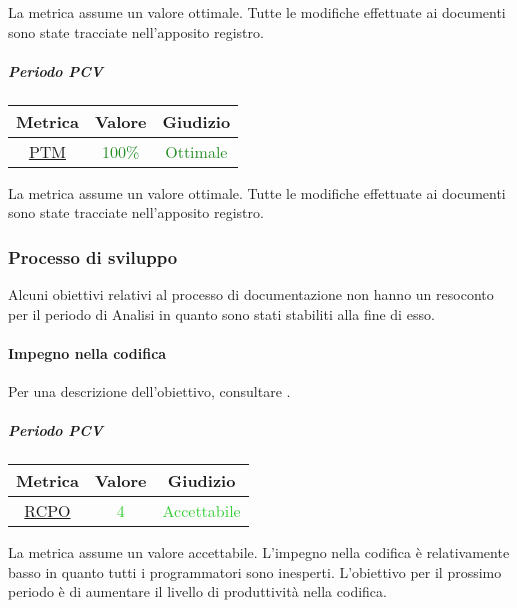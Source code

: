 			La metrica assume un valore ottimale. Tutte le modifiche effettuate ai documenti sono state tracciate nell'apposito registro.
			
			\subparagraph{Periodo PCV} 
			\begin{table}[H]
				\centering
				\begin{tabular}{  c | c | c}
					\hline
					\textbf{Metrica} & \textbf{Valore} & \textbf{Giudizio} \\
					\hline
					\hyperref[MMC]{PTM}   & \textcolor{ForestGreen}{100\%}          & \textcolor{ForestGreen}{Ottimale} \\ \hline
				\end{tabular} 
			\end{table}
			
					La metrica assume un valore ottimale. Tutte le modifiche effettuate ai documenti sono state tracciate nell'apposito registro.
					\newpage
					
		\subsubsection{Processo di sviluppo}
			Alcuni obiettivi relativi al processo di documentazione non hanno un resoconto per il periodo di Analisi in quanto sono stati stabiliti alla fine di esso.
				

				
				\paragraph{Impegno nella codifica}
					Per una descrizione dell'obiettivo, consultare .
					
					\subparagraph{Periodo PCV} 
					\begin{table}[H]
						\centering
						\begin{tabular}{  c | c | c}
							\hline
							\textbf{Metrica} & \textbf{Valore} & \textbf{Giudizio} \\
							\hline
							\hyperref[MMC]{RCPO}   & \textcolor{LimeGreen}{4}          & \textcolor{LimeGreen}{Accettabile} \\ \hline
						\end{tabular} 
					\end{table}
				
				La metrica assume un valore accettabile. L'impegno nella codifica è relativamente basso in quanto tutti i programmatori sono inesperti. L'obiettivo per il prossimo periodo è di aumentare il livello di produttività nella codifica. 
				\newpage
				
